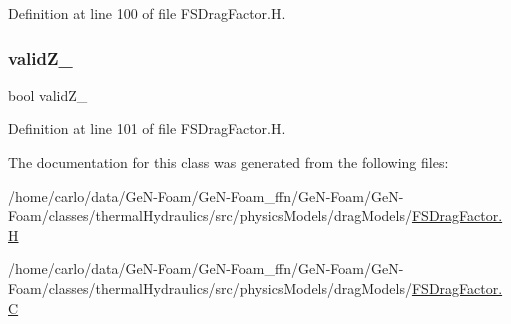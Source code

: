 Definition at line 100 of file F\+S\+Drag\+Factor.\+H.

\mbox{\label{classFoam_1_1FSDragFactor_a7b6a9411b294d4fb22a245d3d0f151f3}} 
\subsubsection{\texorpdfstring{valid\+Z\+\_\+}{validZ\_}}
{\footnotesize\ttfamily bool valid\+Z\+\_\+\hspace{0.3cm}{\ttfamily [protected]}}



Definition at line 101 of file F\+S\+Drag\+Factor.\+H.



The documentation for this class was generated from the following files\+:\begin{DoxyCompactItemize}
\item 
/home/carlo/data/\+Ge\+N-\/\+Foam/\+Ge\+N-\/\+Foam\+\_\+ffn/\+Ge\+N-\/\+Foam/\+Ge\+N-\/\+Foam/classes/thermal\+Hydraulics/src/physics\+Models/drag\+Models/\hyperlink{FSDragFactor_8H}{F\+S\+Drag\+Factor.\+H}\item 
/home/carlo/data/\+Ge\+N-\/\+Foam/\+Ge\+N-\/\+Foam\+\_\+ffn/\+Ge\+N-\/\+Foam/\+Ge\+N-\/\+Foam/classes/thermal\+Hydraulics/src/physics\+Models/drag\+Models/\hyperlink{FSDragFactor_8C}{F\+S\+Drag\+Factor.\+C}\end{DoxyCompactItemize}
